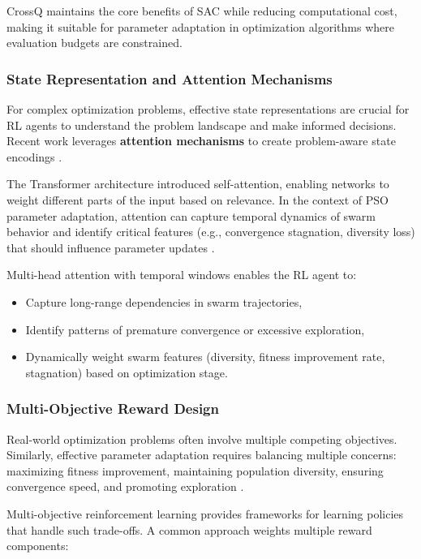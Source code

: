 CrossQ maintains the core benefits of SAC while reducing computational cost, making it suitable for parameter adaptation in optimization algorithms where evaluation budgets are constrained.

\subsubsection*{State Representation and Attention Mechanisms}

For complex optimization problems, effective state representations are crucial for RL agents to understand the problem landscape and make informed decisions. Recent work leverages \textbf{attention mechanisms} to create problem-aware state encodings \cite{Vaswani2017}.

The Transformer architecture \cite{Vaswani2017} introduced self-attention, enabling networks to weight different parts of the input based on relevance. In the context of PSO parameter adaptation, attention can capture temporal dynamics of swarm behavior and identify critical features (e.g., convergence stagnation, diversity loss) that should influence parameter updates \cite{Vaswani2017}.

Multi-head attention with temporal windows enables the RL agent to:
\begin{itemize}
\item Capture long-range dependencies in swarm trajectories,
\item Identify patterns of premature convergence or excessive exploration,
\item Dynamically weight swarm features (diversity, fitness improvement rate, stagnation) based on optimization stage.
\end{itemize}

\subsubsection*{Multi-Objective Reward Design}

Real-world optimization problems often involve multiple competing objectives. Similarly, effective parameter adaptation requires balancing multiple concerns: maximizing fitness improvement, maintaining population diversity, ensuring convergence speed, and promoting exploration \cite{Pitis2019}.

Multi-objective reinforcement learning \cite{Pitis2019} provides frameworks for learning policies that handle such trade-offs. A common approach weights multiple reward components:

